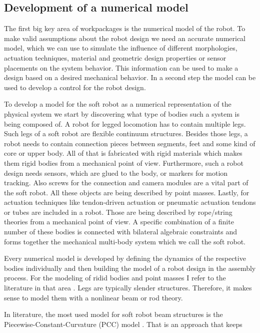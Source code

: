\subsection*{Development of a numerical model}\label{sub:Model}
%
The first big key area of workpackages is the numerical model of the robot.
To make valid assumptions about the robot design we need an accurate numerical model, which we can use to simulate the influence of different
morphologies, actuation techniques, material and geometric design properties or sensor placements on the system behavior. This information can be used to
make a design based on a desired mechanical behavior. In a second step the model can be used to develop a control for the robot design. 
\par
To develop a model for the soft robot as a numerical representation of the physical system we start by discovering what type of bodies such a system is being composed of. A robot for
legged locomotion has to contain multiple legs. Such legs of a soft robot are flexible continuum structures. Besides those legs, a robot needs to contain connection pieces between segments, feet and some kind of core or upper body. All of that 
is fabricated with rigid materials which makes them rigid bodies from a mechanical point of view. Furthermore, such a robot design needs sensors, which are glued to the body, or markers for
motion tracking. Also screws for the connection and camera modules are a vital part of the soft robot. All these objects are being described by point masses. Lastly, for actuation techniques like
tendon-driven actuation or pneumatic actuation tendons or tubes are included in a robot. Those are being described by rope/string theories from a mechanical point of view. A specific
 combination of a finite number of these bodies is connected with bilateral algebraic constraints and forms together the mechanical multi-body system which we call the soft robot.
\par
Every numerical model is developed by defining the dynamics of the respective bodies individually and then building the model of a robot design in the assembly process. 
For the modeling of ridid bodies and point masses I refer to the literature in that area \cite{Glocker2001_book}.
%
Legs are typically slender structures. Therefore, it makes sense to model them with a nonlinear beam or rod theory. 
\par
In literature, the most used model for soft robot beam structures is the Piecewise-Constant-Curvature (PCC) model \cite{Webster2010 , Santina2020}. That is an approach that keeps
